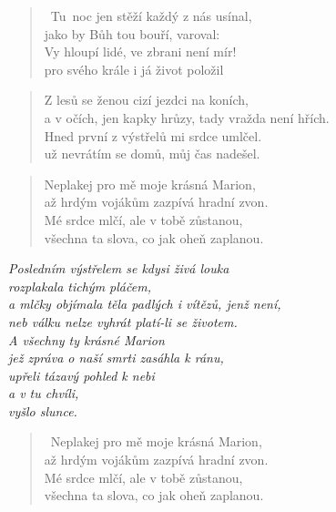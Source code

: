 \begin{song}{}
\begin{verse}
   ~Tu~noc jen stěží každý z nás usínal, \\
   jako by Bůh tou bouří, varoval: \\
   Vy hloupí lidé, ve zbrani není mír! \\
   pro svého krále i já život položil
\end{verse}
\begin{verse}
   Z lesů se ženou cizí jezdci na koních, \\
   a v očích, jen kapky hrůzy, tady vražda není hřích. \\
   Hned první z výstřelů mi srdce umlčel. \\
   už nevrátím se domů, můj čas nadešel.
\end{verse}
\begin{verse}
   Neplakej pro mě moje krásná Marion, \\
   až hrdým vojákům zazpívá hradní zvon. \\
   Mé srdce mlčí, ale v tobě zůstanou, \\
   všechna ta slova, co jak oheň zaplanou.
\end{verse}
  \begin{chords}
  \end{chords}

\pagebreak

\begin{deco}
  \textit{
   Posledním výstřelem se kdysi živá louka \\
   rozplakala tichým pláčem, \\
   a mlčky objímala těla padlých i vítězů, jenž není, \\
   neb válku nelze vyhrát platí-li se životem.  \\
   A všechny ty krásné Marion  \\ 
   jež zpráva o naší smrti zasáhla k ránu, \\
   upřeli tázavý pohled k nebi  \\
   a v tu chvíli,  \\
   vyšlo slunce.
 }
\end{deco}
\begin{verse}
   ~Neplakej pro mě moje krásná Marion, \\
   až hrdým vojákům zazpívá hradní zvon. \\
   Mé srdce mlčí, ale v tobě zůstanou, \\
   všechna ta slova, co jak oheň zaplanou.
\end{verse}
\end{song}
\pagebreak
